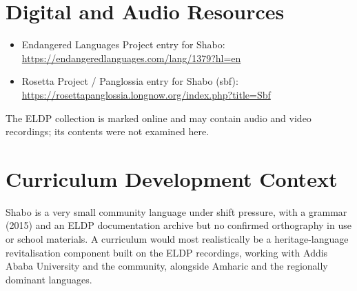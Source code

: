 \documentclass[12pt]{article}
\begin{document}
\section{Digital and Audio Resources}
\begin{itemize}
\item Endangered Languages Project entry for Shabo: \url{https://endangeredlanguages.com/lang/1379?hl=en}
\item Rosetta Project / Panglossia entry for Shabo (sbf): \url{https://rosettapanglossia.longnow.org/index.php?title=Sbf}
\end{itemize}
The ELDP collection is marked online and may contain audio and video recordings; its contents were not examined here.

\section{Curriculum Development Context}
Shabo is a very small community language under shift pressure, with a grammar (2015) and an ELDP documentation archive but no confirmed orthography in use or school materials. A curriculum would most realistically be a heritage-language revitalisation component built on the ELDP recordings, working with Addis Ababa University and the community, alongside Amharic and the regionally dominant languages.
\end{document}
